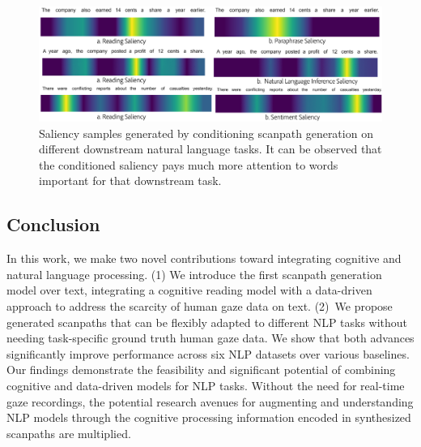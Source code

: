 \begin{figure}[]
    \centering
    \includegraphics[width=\textwidth]{images/intent-scantextgan-saliency.pdf}
    \caption{Saliency samples generated by conditioning scanpath generation on different downstream natural language tasks. It can be observed that the conditioned saliency pays much more attention to words important for that downstream task.}
    \label{fig:intent-saliency-example} 
\end{figure}







\subsection{Conclusion}
\label{sec:ConclusionFutureWork}
In this work, we make two novel contributions toward integrating cognitive and natural language processing. (1) We introduce the first scanpath generation model over text, integrating a cognitive reading model with a data-driven approach to address the scarcity of human gaze data on text. (2)~We propose generated scanpaths that can be flexibly adapted to different NLP tasks without needing task-specific ground truth human gaze data. We show that both advances significantly improve performance across six NLP datasets over various baselines. Our findings demonstrate the feasibility and significant potential of combining cognitive and data-driven models for NLP tasks. Without the need for real-time gaze recordings, the potential research avenues for augmenting and understanding NLP models through the cognitive processing information encoded in synthesized scanpaths are multiplied.


